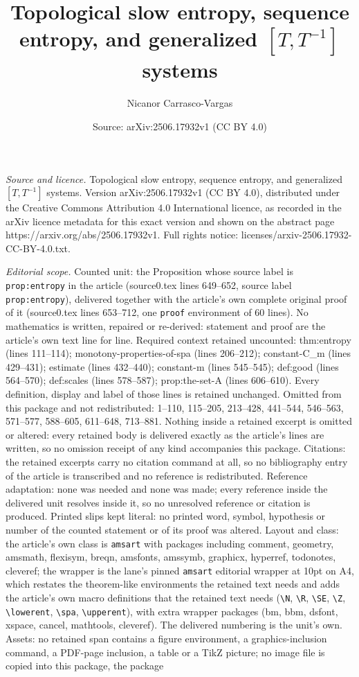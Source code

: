 \documentclass[10pt,a4paper]{amsart}
\title[Topological slow entropy, sequence entropy, and generalized ]{Topological slow entropy, sequence entropy, and generalized $[T,T^{-1}]$ systems}
\author{Nicanor Carrasco-Vargas}
\date{Source: arXiv:2506.17932v1 (CC BY 4.0)}
\begin{document}
\maketitle

\noindent\emph{Source and licence.} Topological slow entropy, sequence entropy, and generalized $[T,T^{-1}]$ systems. Version arXiv:2506.17932v1 (CC BY 4.0), distributed under the Creative Commons Attribution 4.0 International licence, as recorded in the arXiv licence metadata for this exact version and shown on the abstract page https://arxiv.org/abs/2506.17932v1. Full rights notice: licenses/arxiv-2506.17932-CC-BY-4.0.txt.\par\smallskip

\noindent\textit{Editorial scope.} Counted unit: the Proposition whose source label is \texttt{prop:entropy} in the article (source0.tex lines 649--652, source label \texttt{prop:entropy}), delivered together with the article's own complete original proof of it (source0.tex lines 653--712, one \texttt{proof} environment of 60 lines). No mathematics is written, repaired or re-derived: statement and proof are the article's own text line for line. Required context retained uncounted: thm:entropy (lines 111--114); monotony-properties-of-spa (lines 206--212); constant-C\_m (lines 429--431); estimate (lines 432--440); constant-m (lines 545--545); def:good (lines 564--570); def:scales (lines 578--587); prop:the-set-A (lines 606--610). Every definition, display and label of those lines is retained unchanged. Omitted from this package and not redistributed: 1--110, 115--205, 213--428, 441--544, 546--563, 571--577, 588--605, 611--648, 713--881. Nothing inside a retained excerpt is omitted or altered: every retained body is delivered exactly as the article's lines are written, so no omission receipt of any kind accompanies this package. Citations: the retained excerpts carry no citation command at all, so no bibliography entry of the article is transcribed and no reference is redistributed. Reference adaptation: none was needed and none was made; every reference inside the delivered unit resolves inside it, so no unresolved reference or citation is produced. Printed slips kept literal: no printed word, symbol, hypothesis or number of the counted statement or of its proof was altered. Layout and class: the article's own class is \texttt{amsart} with packages including comment, geometry, amsmath, flexisym, breqn, amsfonts, amssymb, graphicx, hyperref, todonotes, cleveref; the wrapper is the lane's pinned \texttt{amsart} editorial wrapper at 10pt on A4, which restates the theorem-like environments the retained text needs and adds the article's own macro definitions that the retained text needs (\texttt{\textbackslash N}, \texttt{\textbackslash R}, \texttt{\textbackslash SE}, \texttt{\textbackslash Z}, \texttt{\textbackslash lowerent}, \texttt{\textbackslash spa}, \texttt{\textbackslash upperent}), with extra wrapper packages (bm, bbm, dsfont, xspace, cancel, mathtools, cleveref). The delivered numbering is the unit's own. Assets: no retained span contains a figure environment, a graphics-inclusion command, a PDF-page inclusion, a table or a TikZ picture; no image file is copied into this package, the package 
\end{document}
